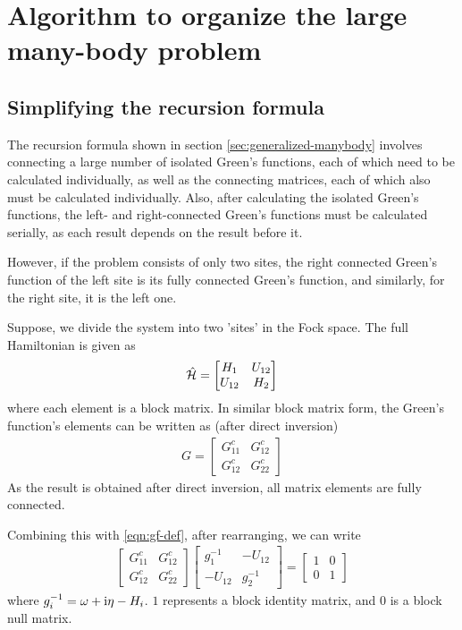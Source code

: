 \chapter{\label{algo}Algorithm to organize the large many-body problem}

\setcounter{equation}{0}
\setcounter{table}{0}
\setcounter{figure}{0}

\section{Simplifying the recursion formula}
	The recursion formula shown in section  \ref{sec:generalized-manybody} involves connecting a large number of isolated Green's functions, each of which need to be calculated individually, as well as the connecting matrices, each of which also must be calculated individually. Also, after calculating the isolated Green's functions, the left- and right-connected Green's functions must be calculated serially, as each result depends on the result before it.
	
	However, if the problem consists of only two sites, the right connected Green's function of the left site is its fully connected Green's function, and similarly, for the right site, it is the left one.
	
	Suppose, we divide the system into two 'sites' in the Fock space. The full Hamiltonian is given as
	\begin{align}
		\hat{\mathcal{H}} =
		\begin{bmatrix}
			H_1 	& 	U_{12} \\
			U_{12} 	& 	H_2
		\end{bmatrix}
	\end{align}
	where each element is a block matrix. In similar block matrix form, the Green's function's elements can be written as (after direct inversion)
	\begin{align}
		G =
			\begin{bmatrix}
			{G}^{c}_{11} 	& 	{G}^{c}_{12} \\
			{G}^{c}_{12} 	& 	{G}^{c}_{22}
			\end{bmatrix}
	\end{align}
	As the result is obtained after direct inversion, all matrix elements are fully connected.
	
	Combining this with \eqref{eqn:gf-def}, after rearranging, we can write
	\begin{align}
		\begin{bmatrix}
			{G}^{c}_{11} 	& 	{G}^{c}_{12} \\
			{G}^{c}_{12} 	& 	{G}^{c}_{22}
		\end{bmatrix}
		\begin{bmatrix}
			g^{-1}_{1} 	& 	-U_{12} \\
			-U_{12} 	& 	g^{-1}_{2}
		\end{bmatrix} = 
		\begin{bmatrix}
			1 & 0\\
			0 & 1
		\end{bmatrix}
	\end{align}
	where $ g^{-1}_{i} = \omega +\mathrm{i} \eta - H_i $. $ 1 $ represents a block identity matrix, and $ 0 $ is a block null matrix.
	
